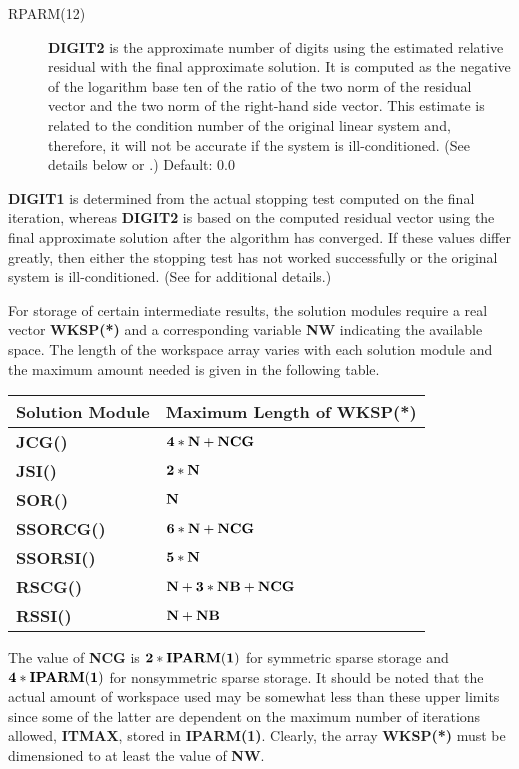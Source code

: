 \begin{description}
 \item[RPARM(12)] {\bf DIGIT2} is the approximate number of digits using 
                  the estimated relative residual with the final approximate
                  solution.  It is computed as the negative of the logarithm
                  base ten of the ratio of the two norm of the residual
                  vector and the two norm of the right-hand side vector.
                  This estimate is related to the condition number of the
                  original linear system and, therefore, it will not be
                  accurate if the system is ill-conditioned.  (See details
                  below or \cite{6}.)  Default: $0.0$
\end{description}
\bigskip 
 
{\bf DIGIT1} is determined from the actual stopping test computed on 
the final iteration, whereas {\bf DIGIT2} is based on the computed 
residual vector using the final approximate solution after the algorithm 
has converged.  If these values differ greatly, then either the stopping 
test has not worked successfully or the original system is ill-conditioned.
(See \cite{6} for additional details.)
 
For storage of certain intermediate results, the solution modules
require a real vector {\bf WKSP(*)} and a corresponding variable {\bf NW}
indicating the available space.  The length of the workspace array varies 
with each solution module and the maximum amount needed is given in 
the following table.
 
\bigskip
\begin{tabular}{ll} \hline
  Solution Module & Maximum Length of {\bf WKSP(*)} \\ \hline
  {\bf JCG()}    & ${\bf 4*N + NCG}$ \\
  {\bf JSI()}    & ${\bf 2*N}$ \\
  {\bf SOR()}    & ${\bf N}$ \\
  {\bf SSORCG()} & ${\bf 6*N + NCG}$ \\
  {\bf SSORSI()} & ${\bf 5*N}$ \\
  {\bf RSCG()}   & ${\bf N + 3*NB + NCG}$ \\
  {\bf RSSI()}   & ${\bf N + NB}$ \\ \hline
\end{tabular}
\bigskip
 
\noindent
The value of {\bf NCG} is ${\bf 2*IPARM(1)}$ for symmetric sparse storage 
and ${\bf 4*IPARM(1)}$ for nonsymmetric sparse storage.  It should be noted 
that the actual amount of workspace used may be somewhat less than these 
upper limits since some of the latter are dependent on the maximum number 
of iterations allowed, {\bf ITMAX}, stored in {\bf IPARM(1)}.  Clearly, 
the array {\bf WKSP(*)} must be dimensioned to at least the value of 
{\bf NW}.
 
